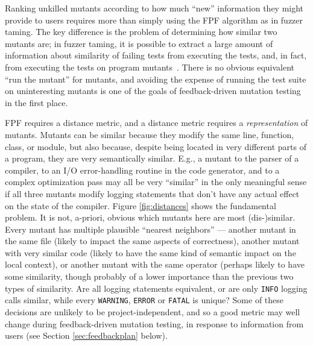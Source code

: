 Ranking unkilled mutants according to how much ``new'' information they might
provide to users requires more than simply using the FPF algorithm as
in fuzzer taming.  The key difference is the problem of determining
how similar two mutants are; in fuzzer taming, it is possible to
extract a large amount of information about similarity of failing
tests from executing the tests, and, in fact, from executing the tests
on program mutants~\cite{PLDI13,distMut}.  There is no obvious equivalent
``run the mutant'' for mutants, and avoiding the expense of running
the test suite on uninteresting mutants is one of the goals of
feedback-driven mutation testing in the first place.

FPF requires a distance metric, and a distance metric requires a
\emph{representation} of mutants.  Mutants can be similar because they
modify the same line, function, class, or module, but also because,
despite being located in very different parts of a program, they are
very semantically similar.  E.g., a mutant to the parser of a compiler, to
an I/O error-handling routine in the code generator, and to a complex
optimization pass may all be very ``similar'' in the only meaningful
sense if all three mutants modify logging statements that don't have
any actual effect on the state of the compiler.  Figure
\ref{fig:distances} shows the fundamental problem.  It is not,
a-priori, obvious which mutants here are most (dis-)similar.  Every
mutant has multiple plausible ``nearest neighbors'' --- another mutant
in the same file (likely to impact the same aspects of correctness),
another mutant with very similar code (likely to have the same kind of
semantic impact on the local context), or another mutant with the same operator (perhaps
likely to have some similarity, though probably of a lower importance
than the previous two types of similarity.  Are all logging statements
equivalent, or are only {\tt INFO} logging calls similar, while every
{\tt WARNING}, {\tt ERROR} or {\tt FATAL} is unique?  Some of these
decisions are unlikely to be project-independent, and so a good metric
may well change during feedback-driven mutation testing, in response
to information from users (see Section \ref{sec:feedbackplan} below).

